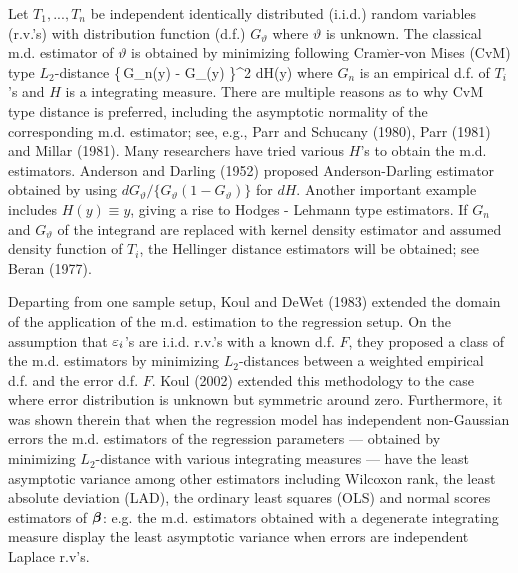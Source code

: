 Let $T_{1},...,T_{n}$ be independent identically distributed (i.i.d.) random variables (r.v.'s) with distribution function (d.f.) $G_{\vartheta}$ where $\vartheta$ is unknown. The classical m.d.\,\,estimator of $\vartheta$ is obtained by minimizing following Cram$\grave{\textrm{e}}$r-von Mises (CvM) type $L_2$-distance
\ben{}
\int \big\{\,G_{n}(y) - G_{\vartheta}(y)    \big\}^2 dH(y)
\een
where $G_{n}$ is an empirical d.f. of $T_{i}$'s and $H$ is a integrating measure. There are multiple reasons as to why CvM type distance is preferred, including the asymptotic normality of the corresponding m.d.\,\,estimator; see, e.g., Parr and Schucany (1980), Parr (1981) and Millar (1981). Many researchers have tried various $H$'s to obtain the m.d.\,\,estimators. Anderson and Darling (1952) proposed Anderson-Darling estimator obtained by using $dG_{\vartheta}/\{G_{\vartheta}(1-G_{\vartheta})\}$ for $dH$. Another important example includes $H(y)\equiv y$, giving a rise to Hodges - Lehmann type estimators. If $G_{n}$ and $G_{\vartheta}$ of the integrand are replaced with kernel density estimator and assumed density function of $T_{i}$, the Hellinger distance estimators will be obtained; see Beran (1977).

Departing from one sample setup, Koul and DeWet (1983) extended the domain of the application of the m.d.\,\,estimation to the regression setup. On the assumption that $\varepsilon_i$'s are i.i.d.\,\,r.v.'s with a known d.f.\,\,$F$, they proposed a class of the m.d.\,\,estimators by minimizing $L_2$-distances between a weighted empirical d.f.\,\,and the error d.f.\,\,$F$. Koul (2002) extended this methodology to the case where error distribution is unknown but symmetric around zero. Furthermore, it was shown therein that when the regression model has independent non-Gaussian errors the m.d.\,\,estimators of the regression parameters --- obtained by minimizing $L_{2}$-distance with various integrating measures --- have the least asymptotic variance among other estimators including Wilcoxon rank, the least absolute deviation (LAD), the ordinary least squares (OLS) and normal scores estimators of $\mbox{\boldmath $\beta$}$: e.g.\,\,the m.d.\,\,estimators obtained with a degenerate integrating measure display the least asymptotic variance when errors are independent Laplace r.v's.

